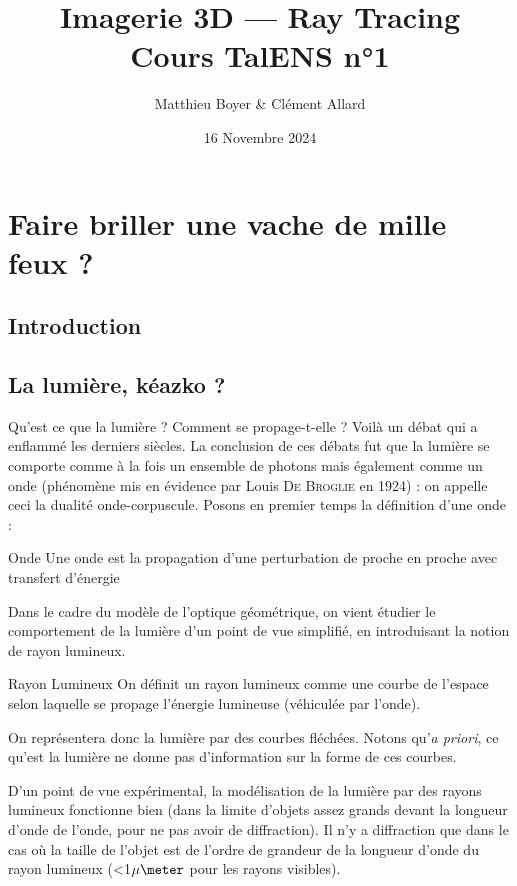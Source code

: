 \documentclass{classe}
\title{Imagerie 3D --- Ray Tracing\\ \small Cours TalENS n°1}
\author{Matthieu Boyer \& Clément Allard}
\date{16 Novembre 2024}
\begin{document}
\section{Faire briller une vache de mille feux ?}
\subsection{Introduction}
\subsection{La lumière, kéazko ?}
Qu'est ce que la lumière ? Comment se propage-t-elle ? Voilà un débat qui a enflammé les derniers siècles. La conclusion de ces débats fut que la lumière se comporte comme à la fois un ensemble de photons mais également comme un onde (phénomène mis en évidence par Louis \textsc{De Broglie} en 1924) : on appelle ceci la dualité onde-corpuscule. Posons en premier temps la définition d'une onde :
\begin{définition}{Onde}{}
Une onde est la propagation d'une perturbation de proche en proche avec transfert d'énergie
\end{définition}
Dans le cadre du modèle de l'optique géométrique, on vient étudier le comportement de la lumière d'un point de vue simplifié, en introduisant la notion de rayon lumineux.
\begin{définition}{Rayon Lumineux}{}
On définit un rayon lumineux comme une courbe de l'espace selon laquelle se propage l'énergie lumineuse (véhiculée par l'onde).
\end{définition}
On représentera donc la lumière par des courbes fléchées.
Notons qu'\textit{a priori}, ce qu'est la lumière ne donne pas d'information sur la forme de ces courbes.
\begin{remarque}{}{}
	D'un point de vue expérimental, la modélisation de la lumière par des rayons lumineux fonctionne bien (dans la limite d'objets assez grands devant la longueur d'onde de l'onde, pour ne pas avoir de diffraction).
	Il n'y a diffraction que dans le cas où la taille de l'objet est de l'ordre de grandeur de la longueur d'onde du rayon lumineux (<1$\mu\meter$ pour les rayons visibles).
\end{remarque}
\end{document}
